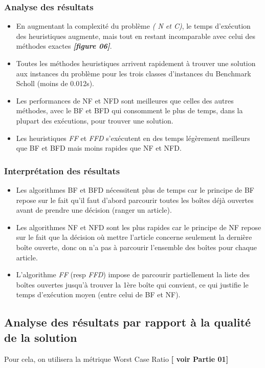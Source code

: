 \documentclass[class=article, crop=false]{standalone}
\begin{document}
\subsubsection{Analyse des résultats}
\begin{itemize}
    \item En augmentant la complexité du problème \emph{( N et C)}, le temps d'exécution des heuristiques augmente, mais tout en restant incomparable avec celui des méthodes exactes \textbf{\emph{[figure 06]}}.
    \item Toutes les méthodes heuristiques arrivent rapidement à trouver une solution aux instances du problème pour les trois classes d’instances du Benchmark Scholl (moins de 0.012s).
    \item Les performances de NF et NFD sont meilleures que celles des autres méthodes, avec le BF et BFD qui consomment le plus de temps, dans la plupart des exécutions, pour trouver une solution.
    \item Les heuristiques \emph{FF} et \emph{FFD} s’exécutent en des temps légèrement meilleurs que BF et BFD mais moins rapides que NF et NFD.
\end{itemize}

\subsubsection{Interprétation des résultats}
\begin{itemize}
    \item Les algorithmes BF et BFD nécessitent plus de temps car le principe de BF repose sur le fait qu’il faut d’abord parcourir toutes les boîtes déjà ouvertes avant de prendre une décision (ranger un article).
    \item Les algorithmes NF et NFD sont les plus rapides car le principe de NF repose sur le fait que la décision où mettre l’article concerne seulement la dernière boîte ouverte, donc on n’a pas à parcourir l’ensemble des boîtes pour chaque article.
    \item L'algorithme \emph{FF} (resp \emph{FFD}) impose de parcourir partiellement la liste des boîtes ouvertes jusqu’à trouver la 1ère boîte qui convient, ce qui justifie le temps d’exécution moyen (entre celui de BF et NF).
\end{itemize}

\subsection{Analyse des résultats par rapport à la qualité de la solution}
Pour cela, on utilisera la métrique Worst Case Ratio \textbf{[ voir Partie 01]} \\
\end{document}
